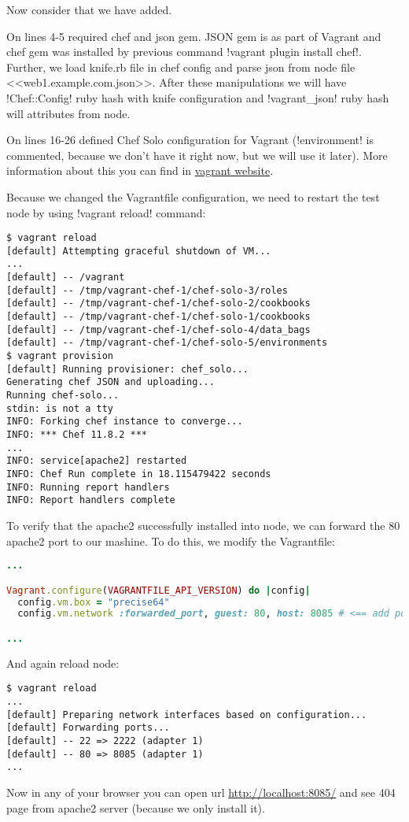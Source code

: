 Now consider that we have added.

On lines 4-5 required chef and json gem. JSON gem is as part of Vagrant and chef gem was installed by previous command \inline!vagrant plugin install chef!. Further, we load knife.rb file in chef config and parse json from node file <<web1.example.com.json>>. After these manipulations we will have \inline!Chef::Config! ruby hash with knife configuration and \inline!vagrant_json! ruby hash will attributes from node.

On lines 16-26 defined Chef Solo configuration for Vagrant (\inline!environment! is commented, because we don't have it right now, but we will use it later). More information about this you can find in \href{http://docs.vagrantup.com/v2/provisioning/chef\_solo.html}{vagrant website}.

Because we changed the Vagrantfile configuration, we need to restart the test node by using \inline!vagrant reload! command:

\begin{lstlisting}[label=lst:my-cloud-vagrant8]
$ vagrant reload
[default] Attempting graceful shutdown of VM...
...
[default] -- /vagrant
[default] -- /tmp/vagrant-chef-1/chef-solo-3/roles
[default] -- /tmp/vagrant-chef-1/chef-solo-2/cookbooks
[default] -- /tmp/vagrant-chef-1/chef-solo-1/cookbooks
[default] -- /tmp/vagrant-chef-1/chef-solo-4/data_bags
[default] -- /tmp/vagrant-chef-1/chef-solo-5/environments
$ vagrant provision
[default] Running provisioner: chef_solo...
Generating chef JSON and uploading...
Running chef-solo...
stdin: is not a tty
INFO: Forking chef instance to converge...
INFO: *** Chef 11.8.2 ***
...
INFO: service[apache2] restarted
INFO: Chef Run complete in 18.115479422 seconds
INFO: Running report handlers
INFO: Report handlers complete
\end{lstlisting}

To verify that the apache2 successfully installed into node, we can forward the 80 apache2 port to our mashine. To do this, we modify the Vagrantfile:

\begin{lstlisting}[language=Ruby, label=lst:my-cloud-vagrant9,title=my-cloud/nodes/Vagrantfile]
...

Vagrant.configure(VAGRANTFILE_API_VERSION) do |config|
  config.vm.box = "precise64"
  config.vm.network :forwarded_port, guest: 80, host: 8085 # <== add port forwarding

...
\end{lstlisting}

And again reload node:

\begin{lstlisting}[label=lst:my-cloud-vagrant10]
$ vagrant reload
...
[default] Preparing network interfaces based on configuration...
[default] Forwarding ports...
[default] -- 22 => 2222 (adapter 1)
[default] -- 80 => 8085 (adapter 1)
...
\end{lstlisting}

Now in any of your browser you can open url \href{http://localhost:8085/}{http://localhost:8085/} and see 404 page from apache2 server (because we only install it).
